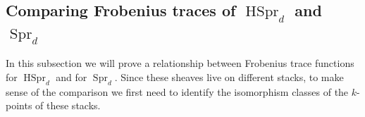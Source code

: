 \documentclass[reqno]{amsart}
\numberwithin{equation}{section}
\DeclareMathOperator{\supp}{supp}
\DeclareMathOperator{\Spr}{Spr}
\DeclareMathOperator{\HSpr}{HSpr}
\newcommand{\SH}{\textup{SkHm}}
\newcommand{\bu}{\bullet}
\newcommand\g\gamma
\newcommand{\s}{\sigma}
\newcommand\cB{\mathcal{B}}
\newcommand\cL{\mathcal{L}}
\newcommand\cQ{\mathcal{Q}}
\newtheorem{lemma}[thm]{Lemma}
\theoremstyle{remark}
\numberwithin{equation}{section}
\begin{document}
%



\subsection{Comparing Frobenius traces of $\HSpr_{d}$ and $\Spr_{d}$}\label{ss:trace comp Spr}
In this subsection we will prove a relationship between Frobenius trace functions for $\HSpr_{d}$ and for $\Spr_{d}$. Since these sheaves live on different stacks, to make sense of the comparison we first need to identify the isomorphism classes of the $k$-points of these stacks.
\end{document}
